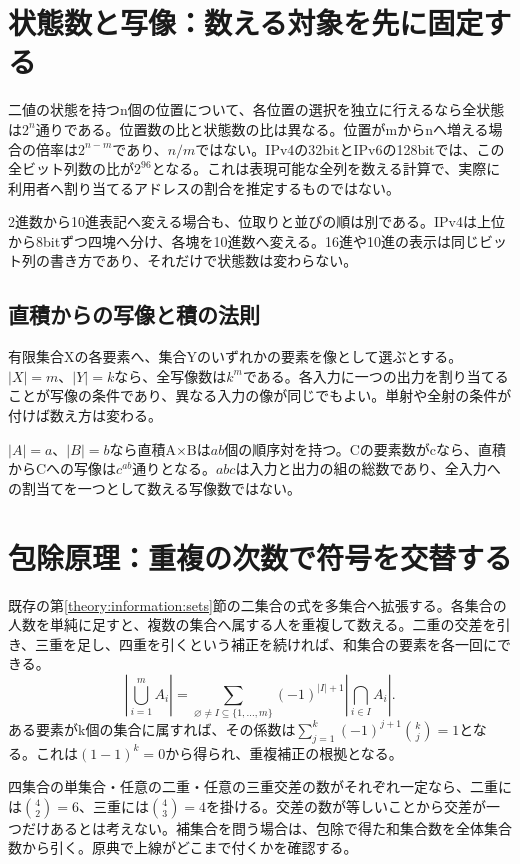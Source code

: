 \section{状態数と写像：数える対象を先に固定する}
\label{theory:discrete:bitcount}
二値の状態を持つn個の位置について、各位置の選択を独立に行えるなら全状態は\(2^n\)通りである。位置数の比と状態数の比は異なる。位置がmからnへ増える場合の倍率は\(2^{n-m}\)であり、\(n/m\)ではない。IPv4の32bitとIPv6の128bitでは、この全ビット列数の比が\(2^{96}\)となる\parencite{rfc4291_addresses}。これは表現可能な全列を数える計算で、実際に利用者へ割り当てるアドレスの割合を推定するものではない。

2進数から10進表記へ変える場合も、位取りと並びの順は別である。IPv4は上位から8bitずつ四塊へ分け、各塊を10進数へ変える。16進や10進の表示は同じビット列の書き方であり、それだけで状態数は変わらない。

\subsection{直積からの写像と積の法則}
\label{theory:discrete:mappings}
有限集合Xの各要素へ、集合Yのいずれかの要素を像として選ぶとする。\(|X|=m\)、\(|Y|=k\)なら、全写像数は\(k^m\)である。各入力に一つの出力を割り当てることが写像の条件であり、異なる入力の像が同じでもよい。単射や全射の条件が付けば数え方は変わる。

\(|A|=a\)、\(|B|=b\)なら直積A\(\times\)Bは\(ab\)個の順序対を持つ。Cの要素数がcなら、直積からCへの写像は\(c^{ab}\)通りとなる。\(abc\)は入力と出力の組の総数であり、全入力への割当てを一つとして数える写像数ではない。

\section{包除原理：重複の次数で符号を交替する}
\label{theory:discrete:inclusion}
既存の第\ref{theory:information:sets}節の二集合の式を多集合へ拡張する。各集合の人数を単純に足すと、複数の集合へ属する人を重複して数える。二重の交差を引き、三重を足し、四重を引くという補正を続ければ、和集合の要素を各一回にできる\parencite{mit_discrete2015}。
\[
\left|\bigcup_{i=1}^{m}A_i\right|
=\sum_{\varnothing\ne I\subseteq\{1,\ldots,m\}}
(-1)^{|I|+1}\left|\bigcap_{i\in I}A_i\right|.
\]
ある要素がk個の集合に属すれば、その係数は\(\sum_{j=1}^k(-1)^{j+1}\binom{k}{j}=1\)となる。これは\((1-1)^k=0\)から得られ、重複補正の根拠となる。

四集合の単集合・任意の二重・任意の三重交差の数がそれぞれ一定なら、二重には\(\binom42=6\)、三重には\(\binom43=4\)を掛ける。交差の数が等しいことから交差が一つだけあるとは考えない。補集合を問う場合は、包除で得た和集合数を全体集合数から引く。原典で上線がどこまで付くかを確認する。

